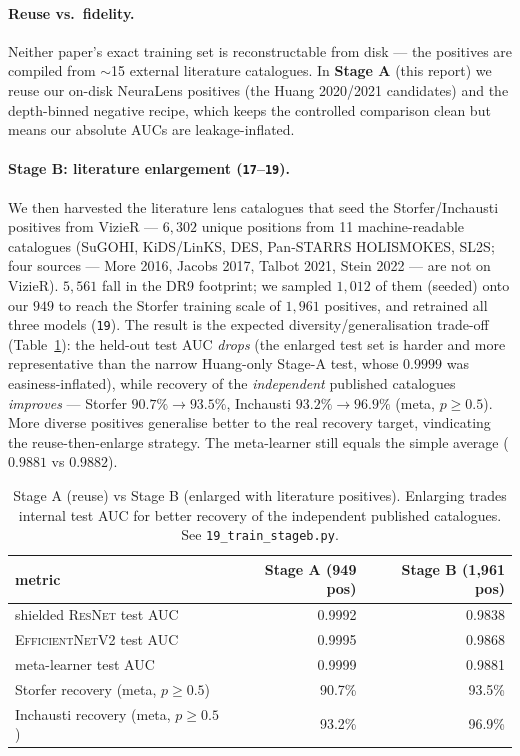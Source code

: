 \documentclass[11pt,letterpaper]{article}
\newcommand{\ResNet}{\textsc{ResNet}}
\newcommand{\EffNet}{\textsc{EfficientNetV2}}
\begin{document}
\paragraph{Reuse vs.\ fidelity.} Neither paper's exact training set is
reconstructable from disk --- the positives are compiled from $\sim$15 external
literature catalogues. In \textbf{Stage A} (this report) we reuse our on-disk
NeuraLens positives (the Huang 2020/2021 candidates) and the depth-binned
negative recipe, which keeps the controlled comparison clean but means our
absolute AUCs are leakage-inflated.

\paragraph{Stage B: literature enlargement (\texttt{17}--\texttt{19}).} We then
harvested the literature lens catalogues that seed the Storfer/Inchausti
positives from VizieR --- $6{,}302$ unique positions from 11 machine-readable
catalogues (SuGOHI, KiDS/LinKS, DES, Pan-STARRS HOLISMOKES, SL2S; four sources
--- More 2016, Jacobs 2017, Talbot 2021, Stein 2022 --- are not on VizieR).
$5{,}561$ fall in the DR9 footprint; we sampled $1{,}012$ of them (seeded) onto
our $949$ to reach the Storfer training scale of $1{,}961$ positives, and
retrained all three models (\texttt{19}). The result is the expected
diversity/generalisation trade-off (Table~\ref{tab:stageb}): the held-out test
AUC \emph{drops} (the enlarged test set is harder and more representative than the
narrow Huang-only Stage-A test, whose $0.9999$ was easiness-inflated), while
recovery of the \emph{independent} published catalogues \emph{improves} ---
Storfer $90.7\%\to93.5\%$, Inchausti $93.2\%\to96.9\%$ (meta, $p\ge0.5$). More
diverse positives generalise better to the real recovery target, vindicating the
reuse-then-enlarge strategy. The meta-learner still equals the simple average
($0.9881$ vs $0.9882$).

\begin{table}[htbp]
\centering
\begin{tabular}{lrr}
\toprule
metric & Stage A (949 pos) & Stage B (1,961 pos) \\
\midrule
shielded \ResNet{} test AUC      & 0.9992 & 0.9838 \\
\EffNet{} test AUC               & 0.9995 & 0.9868 \\
meta-learner test AUC            & 0.9999 & 0.9881 \\
Storfer recovery (meta, $p\ge0.5$)   & 90.7\% & 93.5\% \\
Inchausti recovery (meta, $p\ge0.5$) & 93.2\% & 96.9\% \\
\bottomrule
\end{tabular}
\caption{Stage A (reuse) vs Stage B (enlarged with literature positives).
Enlarging trades internal test AUC for better recovery of the independent
published catalogues. See \texttt{19\_train\_stageb.py}.}
\label{tab:stageb}
\end{table}
\end{document}

